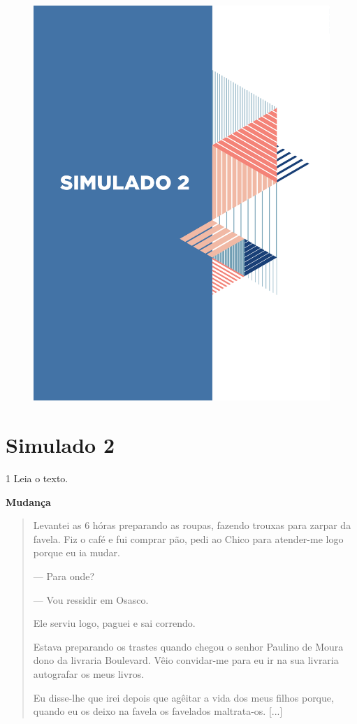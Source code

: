 \pagebreak

\mbox{}

\begin{figure}
\vspace*{-3cm}
\hspace*{-3.7cm}\includegraphics[scale=1]{../watermarks/2simulado9ano.pdf}
\end{figure}


\pagebreak

\section*{Simulado 2}

\num{1} Leia o texto.

\textbf{Mudança}

\begin{quote}
Levantei as 6 hóras preparando as roupas, fazendo trouxas para zarpar da
favela. Fiz o café e fui comprar pão, pedi ao Chico para atender-me logo
porque eu ia mudar.

--- Para onde?

--- Vou ressidir em Osasco.

Ele serviu logo, paguei e sai correndo.

Estava preparando os trastes quando chegou o senhor Paulino de Moura
dono da livraria Boulevard. Vêio convidar-me para eu ir na sua livraria
autografar os meus livros.

Eu disse-lhe que irei depois que agêitar a vida dos meus filhos porque,
quando eu os deixo na favela os favelados maltrata-os. {[}...{]}
\end{quote}

